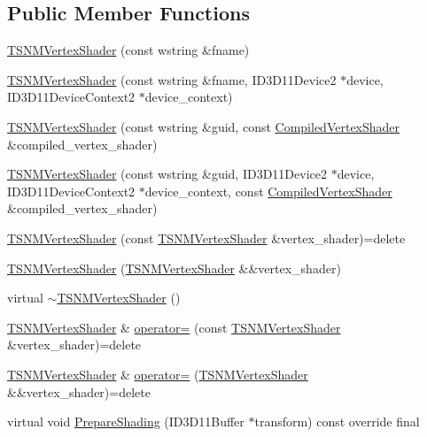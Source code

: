\subsection*{Public Member Functions}
\begin{DoxyCompactItemize}
\item 
\hyperlink{classmage_1_1_t_s_n_m_vertex_shader_a4cba7b2ef6a6d972560db25ccae7cf37}{T\+S\+N\+M\+Vertex\+Shader} (const wstring \&fname)
\item 
\hyperlink{classmage_1_1_t_s_n_m_vertex_shader_a1fbd5a9033cec8fda17c2dee775cbe21}{T\+S\+N\+M\+Vertex\+Shader} (const wstring \&fname, I\+D3\+D11\+Device2 $\ast$device, I\+D3\+D11\+Device\+Context2 $\ast$device\+\_\+context)
\item 
\hyperlink{classmage_1_1_t_s_n_m_vertex_shader_a04520c9d44e69b2750566991e594e023}{T\+S\+N\+M\+Vertex\+Shader} (const wstring \&guid, const \hyperlink{structmage_1_1_compiled_vertex_shader}{Compiled\+Vertex\+Shader} \&compiled\+\_\+vertex\+\_\+shader)
\item 
\hyperlink{classmage_1_1_t_s_n_m_vertex_shader_a7373730850eb5c9108721ff786a331de}{T\+S\+N\+M\+Vertex\+Shader} (const wstring \&guid, I\+D3\+D11\+Device2 $\ast$device, I\+D3\+D11\+Device\+Context2 $\ast$device\+\_\+context, const \hyperlink{structmage_1_1_compiled_vertex_shader}{Compiled\+Vertex\+Shader} \&compiled\+\_\+vertex\+\_\+shader)
\item 
\hyperlink{classmage_1_1_t_s_n_m_vertex_shader_abd4a1b3bb7dacdc2fc602491795008b1}{T\+S\+N\+M\+Vertex\+Shader} (const \hyperlink{classmage_1_1_t_s_n_m_vertex_shader}{T\+S\+N\+M\+Vertex\+Shader} \&vertex\+\_\+shader)=delete
\item 
\hyperlink{classmage_1_1_t_s_n_m_vertex_shader_a3c4a072e8a907437e4dfc15835253da5}{T\+S\+N\+M\+Vertex\+Shader} (\hyperlink{classmage_1_1_t_s_n_m_vertex_shader}{T\+S\+N\+M\+Vertex\+Shader} \&\&vertex\+\_\+shader)
\item 
virtual \hyperlink{classmage_1_1_t_s_n_m_vertex_shader_ac753a201fc0c12978811cca636da107e}{$\sim$\+T\+S\+N\+M\+Vertex\+Shader} ()
\item 
\hyperlink{classmage_1_1_t_s_n_m_vertex_shader}{T\+S\+N\+M\+Vertex\+Shader} \& \hyperlink{classmage_1_1_t_s_n_m_vertex_shader_ad3d444a889fcb9a736d0c0d2fba4ea88}{operator=} (const \hyperlink{classmage_1_1_t_s_n_m_vertex_shader}{T\+S\+N\+M\+Vertex\+Shader} \&vertex\+\_\+shader)=delete
\item 
\hyperlink{classmage_1_1_t_s_n_m_vertex_shader}{T\+S\+N\+M\+Vertex\+Shader} \& \hyperlink{classmage_1_1_t_s_n_m_vertex_shader_a84e30879d000172f309d7ec2f27c3ed1}{operator=} (\hyperlink{classmage_1_1_t_s_n_m_vertex_shader}{T\+S\+N\+M\+Vertex\+Shader} \&\&vertex\+\_\+shader)=delete
\item 
virtual void \hyperlink{classmage_1_1_t_s_n_m_vertex_shader_ad9ee77f591466d7843bcd413e3d7093d}{Prepare\+Shading} (I\+D3\+D11\+Buffer $\ast$transform) const override final
\end{DoxyCompactItemize}
